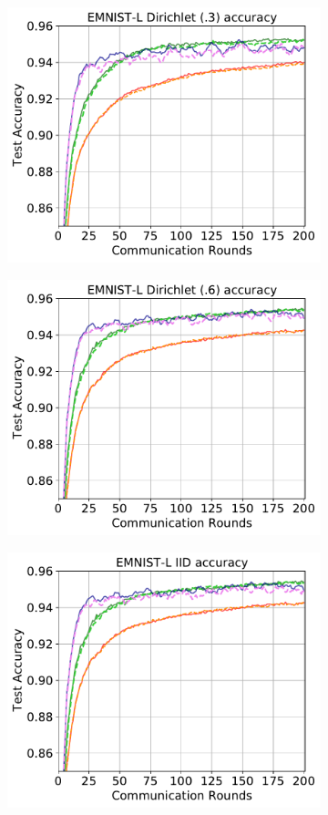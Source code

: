 \documentclass{article} %
\begin{document}
\begin{figure}[ht!]
\begin{subfigure}{.5\textwidth}
  \label{fig:sub13}
\end{subfigure}
\begin{subfigure}{.5\textwidth}
  \centering
  \includegraphics[width=.8\linewidth]{100perfig/emnist_0.3.pdf}
  \label{fig:sub14}
\end{subfigure}
\begin{subfigure}{.5\textwidth}
  \centering
  \includegraphics[width=.8\linewidth]{100perfig/emnist_0.6.pdf}
  \label{fig:sub15}
\end{subfigure}
\begin{subfigure}{.5\textwidth}
  \centering
  \includegraphics[width=.8\linewidth]{100perfig/emnist_iid.pdf}

\end{subfigure}
\end{figure}
\end{document}

